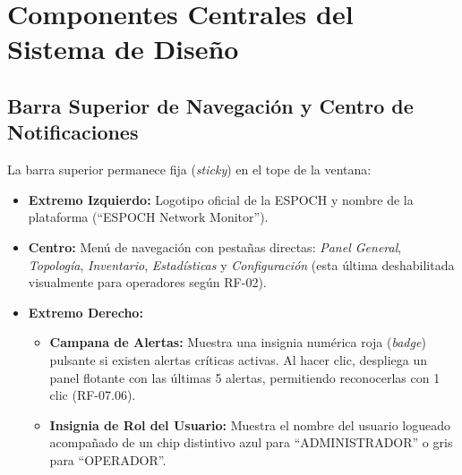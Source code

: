 \documentclass[12pt,a4paper]{report}
\begin{document}
\newpage
\chapter{Componentes Centrales del Sistema de Diseño}

\section{Barra Superior de Navegación y Centro de Notificaciones}
La barra superior permanece fija (\textit{sticky}) en el tope de la ventana:
\begin{itemize}
  \item \textbf{Extremo Izquierdo:} Logotipo oficial de la ESPOCH y nombre de la plataforma (``ESPOCH Network Monitor'').
  \item \textbf{Centro:} Menú de navegación con pestañas directas: \textit{Panel General}, \textit{Topología}, \textit{Inventario}, \textit{Estadísticas} y \textit{Configuración} (esta última deshabilitada visualmente para operadores según RF-02).
  \item \textbf{Extremo Derecho:}
  \begin{itemize}
    \item \textbf{Campana de Alertas:} Muestra una insignia numérica roja (\textit{badge}) pulsante si existen alertas críticas activas. Al hacer clic, despliega un panel flotante con las últimas 5 alertas, permitiendo reconocerlas con 1 clic (RF-07.06).
    \item \textbf{Insignia de Rol del Usuario:} Muestra el nombre del usuario logueado acompañado de un chip distintivo azul para ``ADMINISTRADOR'' o gris para ``OPERADOR''.
  \end{itemize}
\end{itemize}
\end{document}
